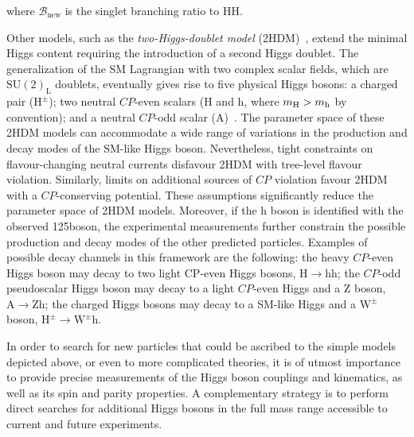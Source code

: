 \noindent where $\mathcal{B}_\mathrm{new}$ is the singlet branching ratio to HH.

Other models, such as the \emph{two-Higgs-doublet model} (2HDM)~\cite{Branco:2011iw}, extend the minimal Higgs content requiring the introduction of a second Higgs doublet. 
The generalization of the SM Lagrangian with two complex scalar fields, which are $\mathrm{SU(2)_L}$ doublets, eventually gives rise to five physical Higgs bosons: a charged pair ($\mathrm{H^{\pm}}$); two neutral $CP$-even scalars (H and h, where $m_{\rm H}>m_{\rm h}$ by convention); and a neutral $CP$-odd scalar (A)~\cite{Craig:2013hca}. The parameter space of these 2HDM models can accommodate a wide range of variations in the production and decay modes of the SM-like Higgs boson. Nevertheless, tight constraints on flavour-changing neutral currents disfavour 2HDM with tree-level flavour violation. Similarly, limits on additional sources of $CP$ violation favour 2HDM with a $CP$-conserving potential. These assumptions significantly reduce the parameter space of 2HDM models. Moreover, if the h boson is identified with the observed 125\GeV boson, the experimental measurements further constrain the possible production and decay modes of the other predicted particles. Examples of possible decay channels in this framework are the following: the  heavy  $CP$-even  Higgs boson  may  decay  to  two  light  CP-even  Higgs bosons, $\mathrm{H \to hh}$; the $CP$-odd pseudoscalar Higgs boson may decay to a light $CP$-even Higgs and a Z boson, $\mathrm{A \to Zh}$; the charged Higgs bosons may decay to a SM-like Higgs and a $\mathrm{W}^\pm$ boson, $\mathrm{H^\pm \to \mathrm{W}^\pm h}$.

In order to search for new particles that could be ascribed to the simple models depicted above, or even to more complicated theories, it is of utmost importance to provide precise measurements of the Higgs boson couplings and kinematics, as well as its spin and parity properties. A complementary strategy is to perform direct searches for additional Higgs bosons in the full mass range accessible to current and future experiments.
